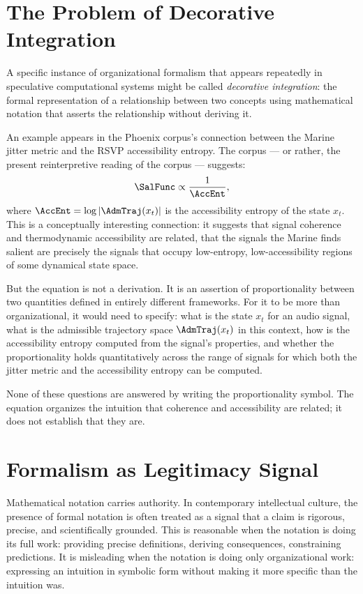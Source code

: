 \section{The Problem of Decorative Integration}
\label{sec:decorative-integration}

A specific instance of organizational formalism that appears
repeatedly in speculative computational systems might be
called \textit{decorative integration}: the formal
representation of a relationship between two concepts using
mathematical notation that asserts the relationship without
deriving it.

An example appears in the Phoenix corpus's connection between
the Marine jitter metric and the RSVP accessibility entropy.
The corpus --- or rather, the present reinterpretive reading
of the corpus --- suggests:
\[
  \SalFunc \propto \frac{1}{\AccEnt},
\]
where $\AccEnt = \log|\AdmTraj(x_t)|$ is the accessibility
entropy of the state $x_t$. This is a conceptually
interesting connection: it suggests that signal coherence
and thermodynamic accessibility are related, that the
signals the Marine finds salient are precisely the signals
that occupy low-entropy, low-accessibility regions of
some dynamical state space.

But the equation is not a derivation. It is an assertion
of proportionality between two quantities defined in
entirely different frameworks. For it to be more than
organizational, it would need to specify: what is the
state $x_t$ for an audio signal, what is the admissible
trajectory space $\AdmTraj(x_t)$ in this context, how
is the accessibility entropy computed from the signal's
properties, and whether the proportionality holds
quantitatively across the range of signals for which
both the jitter metric and the accessibility entropy
can be computed.

None of these questions are answered by writing the
proportionality symbol. The equation organizes the
intuition that coherence and accessibility are related;
it does not establish that they are.

\section{Formalism as Legitimacy Signal}
\label{sec:formalism-legitimacy}

Mathematical notation carries authority. In contemporary
intellectual culture, the presence of formal notation is
often treated as a signal that a claim is rigorous,
precise, and scientifically grounded. This is reasonable
when the notation is doing its full work: providing
precise definitions, deriving consequences, constraining
predictions. It is misleading when the notation is doing
only organizational work: expressing an intuition in
symbolic form without making it more specific than the
intuition was.

